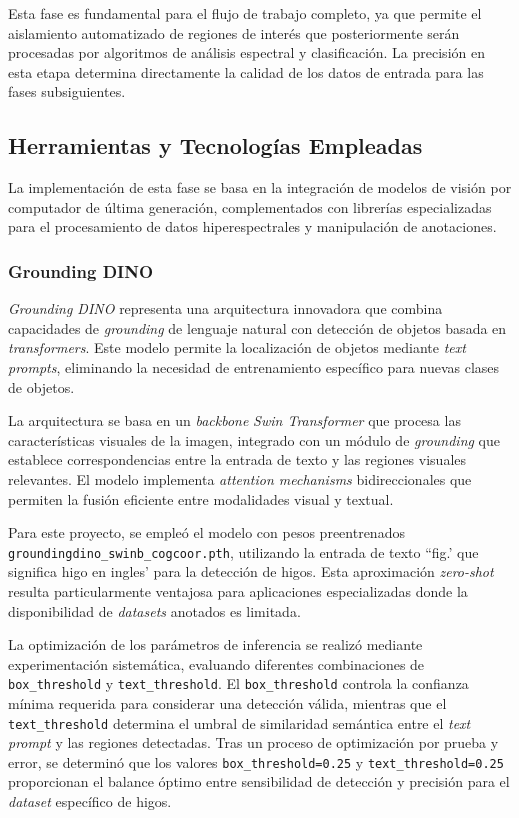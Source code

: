 Esta fase es fundamental para el flujo de trabajo completo, ya que permite el aislamiento automatizado de regiones de interés que posteriormente serán procesadas por algoritmos de análisis espectral y clasificación. La precisión en esta etapa determina directamente la calidad de los datos de entrada para las fases subsiguientes.

\subsection{Herramientas y Tecnologías Empleadas}
\label{docker}

La implementación de esta fase se basa en la integración de modelos de visión por computador de última generación, complementados con librerías especializadas para el procesamiento de datos hiperespectrales y manipulación de anotaciones.

\subsubsection{Grounding DINO}

\emph{Grounding DINO} representa una arquitectura innovadora que combina capacidades de \emph{grounding} de lenguaje natural con detección de objetos basada en \emph{transformers}. Este modelo permite la localización de objetos mediante \emph{text prompts}, eliminando la necesidad de entrenamiento específico para nuevas clases de objetos.

La arquitectura se basa en un \emph{backbone} \emph{Swin Transformer} que procesa las características visuales de la imagen, integrado con un módulo de \emph{grounding} que establece correspondencias entre la entrada de texto y las regiones visuales relevantes. El modelo implementa \emph{attention mechanisms} bidireccionales que permiten la fusión eficiente entre modalidades visual y textual.

Para este proyecto, se empleó el modelo  con pesos preentrenados \texttt{groundingdino\_swinb\_cogcoor.pth}, utilizando la entrada de texto ``fig.' que significa higo en ingles' para la detección de higos. Esta aproximación \emph{zero-shot} resulta particularmente ventajosa para aplicaciones especializadas donde la disponibilidad de \emph{datasets} anotados es limitada.

La optimización de los parámetros de inferencia se realizó mediante experimentación sistemática, evaluando diferentes combinaciones de \texttt{box\_threshold} y \texttt{text\_threshold}. El \texttt{box\_threshold} controla la confianza mínima requerida para considerar una detección válida, mientras que el \texttt{text\_threshold} determina el umbral de similaridad semántica entre el \emph{text prompt} y las regiones detectadas. Tras un proceso de optimización por prueba y error, se determinó que los valores \texttt{box\_threshold=0.25} y \texttt{text\_threshold=0.25} proporcionan el balance óptimo entre sensibilidad de detección y precisión para el \emph{dataset} específico de higos.

